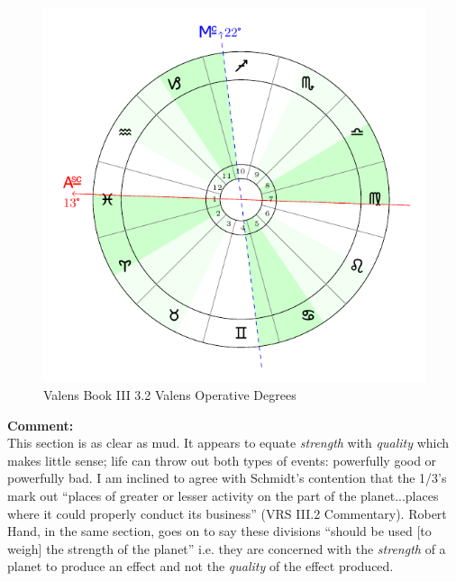 \begin{figure}[H]
\includegraphics[width=\textwidth]{charts/3_02_Valens_opdegs}
\caption{Valens Book III 3.2 Valens Operative Degrees}
\end{figure}

\begin{mdframed}[backgroundcolor=cyan!5]
\textbf{Comment:} \hfill \\
This section is as clear as mud. It appears to equate \textsl{strength} with \textsl{quality} which makes little sense; life can throw out both types of events: powerfully good or powerfully bad. I am inclined to agree with Schmidt's contention that the 1/3's mark out ``places of greater or lesser activity on the part of the planet...places where it could properly conduct its business'' (VRS III.2 Commentary). Robert Hand, in the same section, goes on to say these divisions ``should be used [to weigh] the strength of the planet'' i.e. they are concerned with the \textsl{strength} of a planet to produce an effect and not the \textsl{quality} of the effect produced.
\end{mdframed}

\newpage